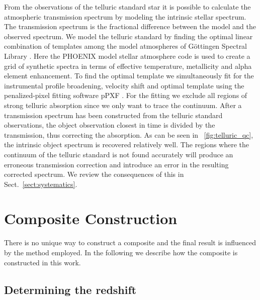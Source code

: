 \documentclass{aa}    %
\newcommand{\figref}[1]{\ref{fig:#1}}
\newcommand{\Fig}[1]{\figurename~\figref{#1}}
\newcommand{\fig}[1]{\Fig{#1}}
\newcommand{\sectionname}{Sect.}
\newcommand{\Sect}[1]{\sectionname~\ref{sect:#1}}
\newcommand{\sect}[1]{\Sect{#1}}
\newcommand{\sectlabel}[1]{\label{sect:#1}}
\begin{document}
From the observations of the telluric standard star it is possible to calculate the atmospheric transmission spectrum by modeling the intrinsic stellar spectrum. The transmission spectrum is the fractional difference between the model and the observed spectrum. We model the telluric standard by finding the optimal linear combination of templates among the model atmospheres of G\"ottingen Spectral Library \citep{Husser2013}. Here the PHOENIX model stellar atmosphere code is used to create a grid of synthetic spectra in terms of effective temperature, metallicity and alpha element enhancement. To find the optimal template we simultaneously fit for the instrumental profile broadening, velocity shift and optimal template using the penalized-pixel fitting software pPXF \citep{Cappellari2004}. For the fitting we exclude all regions of strong telluric absorption since we only want to trace the continuum. After a transmission spectrum has been constructed from the telluric standard observations, the object observation closest in time is divided by the transmission, thus correcting the absorption. As can be seen in \fig{telluric_qc}, the intrinsic object spectrum is recovered relatively well. The regions where the continuum of the telluric standard is not found accurately will produce an erroneous transmission correction and introduce an error in the resulting corrected spectrum. We review the consequences of this in \sect{systematics}. 



\section{Composite Construction}   \sectlabel{construct}

There is no unique way to construct a composite and the final result is influenced by the method employed. In the following we describe how the composite is constructed in this work.

\subsection{Determining the redshift}  \sectlabel{redshifts}
\end{document}
